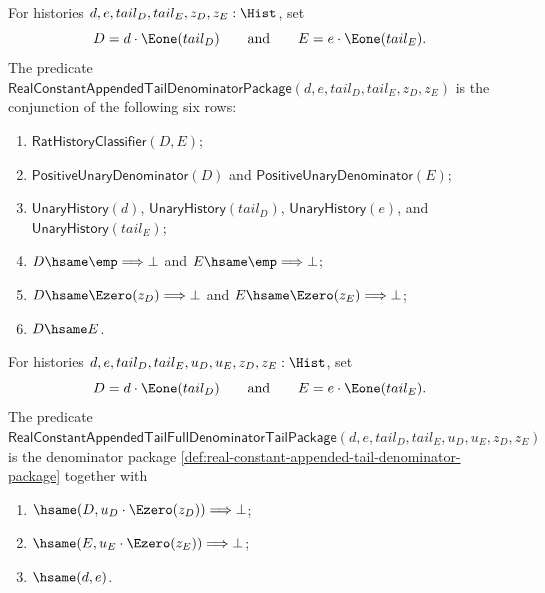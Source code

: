 \begin{definition}
\label{def:real-constant-appended-tail-denominator-package}
For histories $d,e,tail_D,tail_E,z_D,z_E:\Hist$, set
$$
D=d\cdot\Eone(tail_D)
\qquad\text{and}\qquad
E=e\cdot\Eone(tail_E).
$$
The predicate
$\mathsf{RealConstantAppendedTailDenominatorPackage}(d,e,tail_D,tail_E,z_D,z_E)$
is the conjunction of the following six rows:
\begin{enumerate}
  \item $\mathsf{RatHistoryClassifier}(D,E)$;
  \item $\mathsf{PositiveUnaryDenominator}(D)$ and
  $\mathsf{PositiveUnaryDenominator}(E)$;
  \item $\mathsf{UnaryHistory}(d)$, $\mathsf{UnaryHistory}(tail_D)$,
  $\mathsf{UnaryHistory}(e)$, and $\mathsf{UnaryHistory}(tail_E)$;
  \item $D\hsame\emp\Longrightarrow\bot$ and
  $E\hsame\emp\Longrightarrow\bot$;
  \item $D\hsame\Ezero(z_D)\Longrightarrow\bot$ and
  $E\hsame\Ezero(z_E)\Longrightarrow\bot$;
  \item $D\hsame E$.
\end{enumerate}
\end{definition}

\begin{definition}
\label{def:real-constant-appended-tail-full-denominator-tail-package}
For histories $d,e,tail_D,tail_E,u_D,u_E,z_D,z_E:\Hist$, set
$$
D=d\cdot\Eone(tail_D)
\qquad\text{and}\qquad
E=e\cdot\Eone(tail_E).
$$
The predicate
$\mathsf{RealConstantAppendedTailFullDenominatorTailPackage}
(d,e,tail_D,tail_E,u_D,u_E,z_D,z_E)$ is the denominator package
\autoref{def:real-constant-appended-tail-denominator-package} together with
\begin{enumerate}
  \item $\hsame(D,u_D\cdot\Ezero(z_D))\Longrightarrow\bot$;
  \item $\hsame(E,u_E\cdot\Ezero(z_E))\Longrightarrow\bot$;
  \item $\hsame(d,e)$.
\end{enumerate}
\end{definition}

